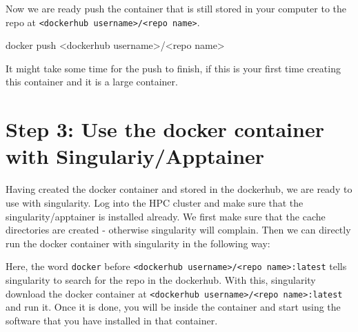 \documentclass[
  letterpaper,
  DIV=11,
  numbers=noendperiod]{scrartcl}
\newenvironment{Shaded}{\begin{snugshade}}{\end{snugshade}}
\newcommand{\ErrorTok}[1]{\textcolor[rgb]{0.68,0.00,0.00}{#1}}
\newcommand{\ExtensionTok}[1]{\textcolor[rgb]{0.00,0.23,0.31}{#1}}
\newcommand{\NormalTok}[1]{\textcolor[rgb]{0.00,0.23,0.31}{#1}}
\newcommand{\OperatorTok}[1]{\textcolor[rgb]{0.37,0.37,0.37}{#1}}
\newcommand{\SpecialCharTok}[1]{\textcolor[rgb]{0.37,0.37,0.37}{#1}}
\begin{document}
Now we are ready push the container that is still stored in your
computer to the repo at
\texttt{\textless{}dockerhub\ username\textgreater{}/\textless{}repo\ name\textgreater{}}.

\begin{Shaded}
\begin{Highlighting}[]
\ExtensionTok{docker}\NormalTok{ push }\OperatorTok{\textless{}}\NormalTok{dockerhub username}\OperatorTok{\textgreater{}}\NormalTok{/}\OperatorTok{\textless{}}\NormalTok{repo name}\OperatorTok{\textgreater{}}
\end{Highlighting}
\end{Shaded}

It might take some time for the push to finish, if this is your first
time creating this container and it is a large container.

\hypertarget{step-3-use-the-docker-container-with-singulariyapptainer}{%
\section{Step 3: Use the docker container with
Singulariy/Apptainer}\label{step-3-use-the-docker-container-with-singulariyapptainer}}

Having created the docker container and stored in the dockerhub, we are
ready to use with singularity. Log into the HPC cluster and make sure
that the singularity/apptainer is installed already. We first make sure
that the cache directories are created - otherwise singularity will
complain. Then we can directly run the docker container with singularity
in the following way:

\begin{Shaded}
\end{Shaded}

Here, the word \texttt{docker} before
\texttt{\textless{}dockerhub\ username\textgreater{}/\textless{}repo\ name\textgreater{}:latest}
tells singularity to search for the repo in the dockerhub. With this,
singularity download the docker container at
\texttt{\textless{}dockerhub\ username\textgreater{}/\textless{}repo\ name\textgreater{}:latest}
and run it. Once it is done, you will be inside the container and start
using the software that you have installed in that container.
\end{document}
